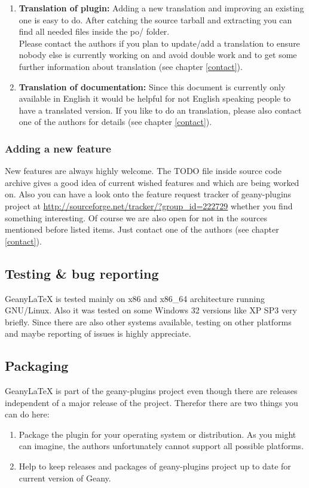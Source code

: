 \documentclass[%
paper=a4,%
fontsize=11pt,%
twoside=false,%
DIV18,
headsepline,
plainheadsepline,
footsepline,
plainfootsepline,
bibliography=totoc,%
listof=totoc,%
BCOR10mm,%
parskip=half,%
openany,%
]{scrartcl}
\begin{document}
\begin{enumerate}
\item \textbf{Translation of plugin:}
	   Adding a new translation and improving an existing one is easy to
	   do. After catching the source tarball and extracting you can find
	   all needed files inside the po/ folder. \\
	   Please contact the authors if you plan to update/add a translation
	   to ensure nobody else is currently working on and avoid double
	   work and to get some further information about translation (see
	   chapter \ref{contact}).
\item \textbf{Translation of documentation:}
	   Since this document is currently only available in English it
	   would be helpful for not English speaking people to have a
	   translated version. If you like to do an translation, please
	   also contact one of the authors for details (see chapter \ref{contact}).
\end{enumerate}

\subsubsection{Adding a new feature}
New features are always highly welcome. The TODO file inside source
code archive gives a good idea of current wished features and which
are being worked on. Also you can have a look onto the feature request
tracker of geany-plugins project at
\url{http://sourceforge.net/tracker/?group\_id=222729} whether you find
something interesting. Of course we are also open for not in the
sources mentioned before listed items. Just contact one of the authors
(see chapter \ref{contact}).

\subsection{Testing \& bug reporting} Geany\LaTeX{} is tested mainly
on x86 and x86\_64 architecture running GNU/Linux. Also it was
tested on some Windows 32 versions like XP SP3 very briefly. Since
there are also other systems available, testing on other platforms
and maybe reporting of issues is highly appreciate.

\subsection{Packaging}
Geany\LaTeX{} is part of the geany-plugins project even though there
are releases independent of a major release of the project. Therefor
there are two things you can do here:
\begin{enumerate}
	\item Package the plugin for your operating system or
	distribution. As you might can imagine, the authors unfortunately
	cannot support all possible platforms.
	\item Help to keep releases and packages of geany-plugins project
	up to date for current version of Geany.
\end{enumerate}
\end{document}

